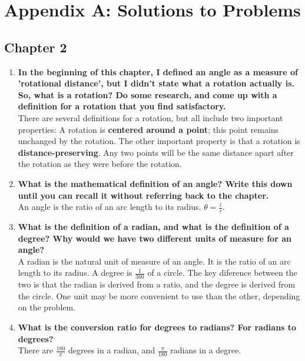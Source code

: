 \section{Appendix A: Solutions to Problems}

\subsection{Chapter 2}


\begin{enumerate}
\item {{\bf In the beginning of this chapter, I defined an angle as a measure of 'rotational distance', but I didn't state what a rotation actually is.  So, what is a rotation?  Do some research, and come up with a definition for a rotation that you find satisfactory.\\}
{There are several definitions for a rotation, but all include two important properties:  A rotation is {\bf centered around a point}; this point remains unchanged by the rotation.  The other important property is that a rotation is {\bf distance-preserving}.  Any two points will be the same distance apart after the rotation as they were before the rotation.}}



\item{{\bf What is the mathematical definition of an angle?  Write this down until you can recall it without referring back to the chapter.\\}
{An angle is the ratio of an arc length to its radius.  $\theta = \frac{l}{r}$.}
}

\item{{\bf What is the definition of a radian, and what is the definition of a degree?  Why would we have two different units of measure for an angle?\\}
{A radian is the natural unit of measure of an angle.  It is the ratio of an arc length to its radius.  A degree is $\frac{1}{360}$ of a circle.  The key diference between the two is that the radian is derived from a ratio, and the degree is derived from the circle.  One unit may be more convenient to use than the other, depending on the problem.}}

\item{{\bf What is the conversion ratio for degrees to radians?  For radians to degrees?\\}
{There are $\frac{180}{\pi}$ degrees in a radian, and $\frac{\pi}{180}$ radians in a degree.}}


\end{enumerate}
